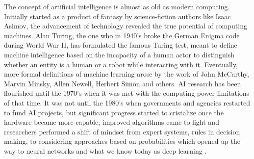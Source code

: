 \par The concept of artificial intelligence is almost as old as modern computing. Initially started as a product of fantasy by science-fiction authors like Isaac Asimov, the advancement of technology revealed the true potential of computing machines. Alan Turing, the one who in 1940's broke the German Enigma code during World War II, has formulated the famous Turing test, meant to define machine intelligence based on the incapacity of a human actor to distinguish whether an entity is a human or a robot while interacting with it. Eventually, more formal definitions of machine learning arose by the work of John McCarthy, Marvin Minsky, Allen Newell, Herbert Simon and others. AI research has been flourished until the 1970's when it was met with the computing power limitations of that time. It was not until the 1980's when governments and agencies restarted to fund AI projects, but significant progress started to cristalize once the hardware became more capable, improved algorithms came to light and 
researchers performed a shift of mindset from expert systems, rules in decision making, to considering approaches based on probabilities which opened up the way to neural networks and what we know today as deep learning \cite{BriefHistoryOfAI}.